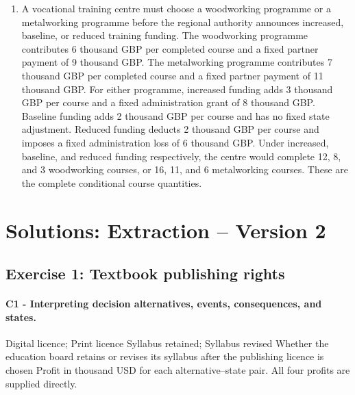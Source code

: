 \begin{enumerate}[leftmargin=0.22in]
\item
A vocational training centre must choose a woodworking programme or a metalworking programme before the regional authority announces increased, baseline, or reduced training funding. The woodworking programme contributes 6 thousand GBP per completed course and a fixed partner payment of 9 thousand GBP. The metalworking programme contributes 7 thousand GBP per completed course and a fixed partner payment of 11 thousand GBP. For either programme, increased funding adds 3 thousand GBP per course and a fixed administration grant of 8 thousand GBP. Baseline funding adds 2 thousand GBP per course and has no fixed state adjustment. Reduced funding deducts 2 thousand GBP per course and imposes a fixed administration loss of 6 thousand GBP. Under increased, baseline, and reduced funding respectively, the centre would complete 12, 8, and 3 woodworking courses, or 16, 11, and 6 metalworking courses. These are the complete conditional course quantities.

\end{enumerate}
\newpage
\newpage
\section{Solutions: Extraction -- Version 2}
\label{sec:solutions-extraction}
\label{toc}
\subsection{Exercise 1: Textbook publishing rights}
\label{sec:problem1-textbook-publishing-rights-c1-c2}
\paragraph*{C1 - Interpreting decision alternatives, events, consequences, and states.}
\label{subsec:problem1-textbook-publishing-rights-c1}
\DecisionElementsTable
{Digital licence; Print licence}
{Syllabus retained; Syllabus revised}
{Whether the education board retains or revises its syllabus after the publishing licence is chosen}
{Profit in thousand USD for each alternative--state pair. All four profits are supplied directly.}
